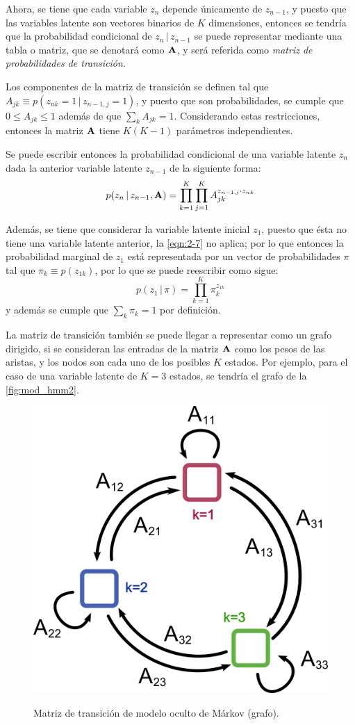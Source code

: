Ahora, se tiene que cada variable $z_n$ depende únicamente de $z_{n-1}$, y puesto que las variables latente son vectores binarios de $K$ dimensiones, entonces se tendría que la probabilidad condicional de $z_n \,|\, z_{n-1}$ se puede representar mediante una tabla o matriz, que se denotará como $\textbf{A}$, y será referida como \textit{matriz de probabilidades de transición}. 

Los componentes de la matriz de transición se definen tal que $A_{jk} \equiv p(z_{nk} = 1 \,|\,  z_{n-1, j} = 1)$, y puesto que son probabilidades, se cumple que $0 \leq A_{jk} \leq 1$ además de que $\sum_k A_{jk} = 1$. Considerando estas restricciones, entonces la matriz $\textbf{A}$ tiene $K (K-1)$ parámetros independientes.

Se puede escribir entonces la probabilidad condicional de una variable latente $z_n$ dada la anterior variable latente $z_{n-1}$ de la siguiente forma: 
\begin{equation}
\label{eqn:2-8}
p(z_n \,|\, z_{n-1}, \textbf{A}) = \prod_{k=1}^K \prod_{j=1}^K A_{jk}^{z_{n-1, j} 
        \cdot z_{nk}}
\end{equation}

Además, se tiene que considerar la variable latente inicial $z_1$, puesto que ésta no tiene una variable latente anterior, la \autoref{eqn:2-7} no aplica; por lo que entonces la probabilidad marginal de $z_1$ está representada por un vector de probabilidades $\pi$ tal que $\pi_k \equiv p(z_{1k})$, por lo que se puede reescribir como sigue: 
\begin{equation}
p(z_1 \,|\, \pi) = \prod_{k=1}^K \pi_k^{z_{1k}}
\label{eqn:2-9}
\end{equation}
y además se cumple que $\sum_k \pi_k = 1$ por definición.

La matriz de transición también se puede llegar a representar como un grafo dirigido, si se consideran las entradas de la matriz $\textbf{A}$ como los pesos de las aristas, y los nodos son cada uno de los posibles $K$ estados. Por ejemplo, para el caso de una variable latente de $K = 3$ estados, se tendría el grafo de la \autoref{fig:mod_hmm2}.

\begin{figure}[tp]
        \myfloatalign
        {\includegraphics[width=0.4\linewidth]{gfx/chap3/mod-hmm2}}
        \caption[Matriz de transición de HMM (grafo)]{Matriz de transición de modelo oculto de Márkov (grafo).}
        \label{fig:mod_hmm2}
\end{figure}


